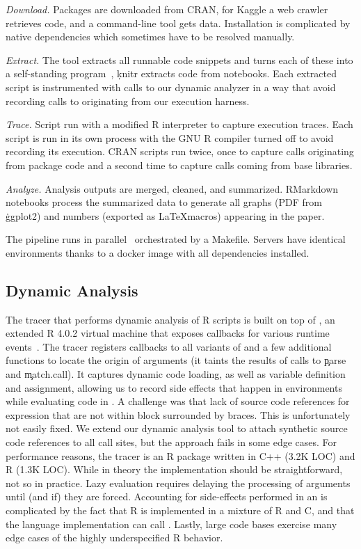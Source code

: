 \documentclass[screen,acmsmall]{acmart}%
\begin{document}
\begin{compactenum}[(1)]
\item \emph{Download.} Packages are downloaded from CRAN, for Kaggle a web
  crawler retrieves code, and a command-line tool gets data. Installation is
  complicated by native dependencies which sometimes have to be resolved
  manually.
\item \emph{Extract.} The \genthat tool extracts all runnable code snippets and
  turns each of these into a self-standing program~\cite{issta18}, \c{knitr}
  extracts code from notebooks. Each extracted script is instrumented with calls
  to our dynamic analyzer in a way that avoid recording calls to \eval
  originating from our execution harness.
\item \emph{Trace.} Script run with a modified R interpreter to capture
  execution traces. Each script is run in its own process with the GNU R
  compiler turned off to avoid recording its execution. CRAN scripts run twice,
  once to capture \eval calls originating from package code and a second time to
  capture calls coming from base libraries.
\item \emph{Analyze.} Analysis outputs are merged, cleaned, and summarized.
  RMarkdown notebooks process the summarized data to generate all graphs (PDF
  from \c{ggplot2}) and numbers (exported as \LaTeX macros) appearing in the
  paper.
\end{compactenum}

 The pipeline runs in parallel~\cite{GNUparallel} orchestrated by a
Makefile. Servers have identical environments thanks to a docker image with all
dependencies installed.

\subsection{Dynamic Analysis}

The tracer that performs dynamic analysis of R scripts is built on top of
\rdyntrace, an extended R 4.0.2 virtual machine that exposes callbacks for
various runtime events~\cite{oopsla19b}. The tracer registers callbacks to all
variants of \eval and a few additional functions to locate the origin of \eval
arguments (it taints the results of calls to \c{parse} and \c{match.call}). It
captures dynamic code loading, as well as variable definition and assignment,
allowing us to record side effects that happen in environments while evaluating
code in \eval. A challenge was that lack of source code references for
expression that are not within block surrounded by braces. This is unfortunately
not easily fixed. We extend our dynamic analysis tool to attach synthetic source
code references to all \eval call sites, but the approach fails in some edge
cases. For performance reasons, the tracer is an R package written in C++ (3.2K
LOC) and R (1.3K LOC). While in theory the implementation should be
straightforward, not so in practice. Lazy evaluation requires delaying the
processing of arguments until (and if) they are forced. Accounting for
side-effects performed in an \eval is complicated by the fact that R is
implemented in a mixture of R and C, and that the language implementation can
call \eval. Lastly, large code bases exercise many edge cases of the highly
underspecified R behavior.
\end{document}
